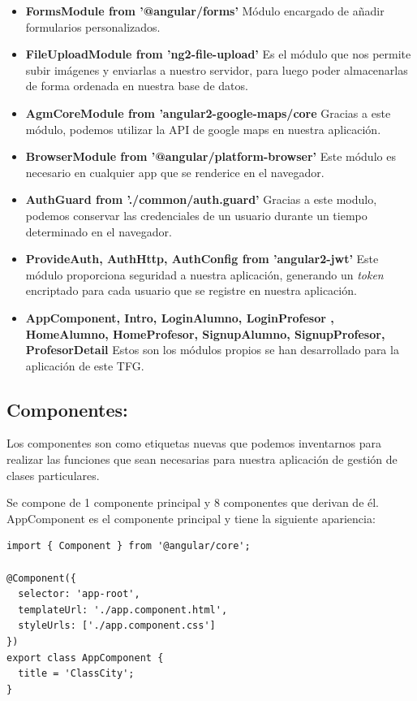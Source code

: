 \begin{itemize}
\item \textbf{ FormsModule from '@angular/forms'} Módulo encargado de añadir formularios personalizados.

\item \textbf{FileUploadModule from 'ng2-file-upload'} Es el módulo que nos permite subir imágenes y enviarlas a nuestro servidor, para luego poder almacenarlas de forma ordenada en nuestra base de datos.

\item \textbf{AgmCoreModule from 'angular2-google-maps/core} Gracias a este módulo, podemos utilizar la API de google maps en nuestra aplicación.

\item \textbf{ BrowserModule from '@angular/platform-browser'} Este módulo es necesario en cualquier app que se renderice en el navegador.


\item \textbf{ AuthGuard from './common/auth.guard'} Gracias a este modulo, podemos conservar las credenciales de un usuario durante un tiempo determinado en el navegador.

\item \textbf{ ProvideAuth, AuthHttp, AuthConfig from 'angular2-jwt'} Este módulo proporciona seguridad a nuestra aplicación, generando un \textit{token} encriptado para cada usuario que se registre en nuestra aplicación.

\item \textbf{AppComponent, Intro, LoginAlumno, LoginProfesor , HomeAlumno, HomeProfesor, SignupAlumno, SignupProfesor, ProfesorDetail } Estos son los módulos propios se han desarrollado para la aplicación de este TFG.
\end{itemize}
\subsection{Componentes: }

Los componentes son como etiquetas nuevas que podemos inventarnos para realizar las funciones que sean necesarias para nuestra aplicación de gestión de clases particulares.

Se compone de 1 componente principal y 8 componentes que derivan de él. AppComponent es el componente principal y tiene la siguiente apariencia:

\begin{lstlisting}[caption=AppsComponent]
import { Component } from '@angular/core';

@Component({
  selector: 'app-root',
  templateUrl: './app.component.html',
  styleUrls: ['./app.component.css']
})
export class AppComponent {
  title = 'ClassCity';
}
\end{lstlisting}

